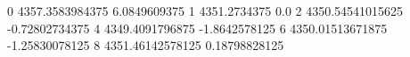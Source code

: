 0 4357.3583984375 6.0849609375
1 4351.2734375 0.0
2 4350.54541015625 -0.72802734375
4 4349.4091796875 -1.8642578125
6 4350.01513671875 -1.25830078125
8 4351.46142578125 0.18798828125
